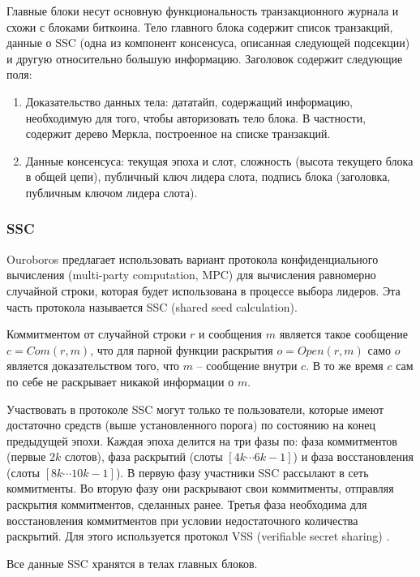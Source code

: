\documentclass[specification,annotation]{itmo-student-thesis}
\begin{document}
Главные блоки несут основную функциональность транзакционного журнала
и схожи с блоками биткоина. Тело главного блока содержит список
транзакций, данные о SSC (одна из компонент консенсуса, описанная
следующей подсекции) и другую относительно большую
информацию. Заголовок содержит следующие поля:

\begin{enumerate}
\item Доказательство данных тела: дататайп, содержащий информацию,
  необходимую для того, чтобы авторизовать тело блока. В частности,
  содержит дерево Меркла, построенное на списке транзакций.
\item Данные консенсуса: текущая эпоха и слот, сложность (высота
  текущего блока в общей цепи), публичный ключ лидера слота, подпись
  блока (заголовка, публичным ключом лидера слота).
\end{enumerate}

\subsubsection{SSC}

Ouroboros предлагает использовать вариант протокола конфиденциального
вычисления (multi-party computation, MPC) для вычисления равномерно
случайной строки, которая будет использована в процессе выбора
лидеров. Эта часть протокола называется SSC (shared seed calculation).

Коммитментом от случайной строки $r$ и сообщения $m$ является такое
сообщение $c = Com(r,m)$, что для парной функции раскрытия $o =
Open(r,m)$ само $o$ является доказательством того, что $m$ --
сообщение внутри $c$. В то же время $c$ сам по себе не раскрывает
никакой информации о $m$.

Участвовать в протоколе SSC могут только те пользователи, которые
имеют достаточно средств (выше установленного порога) по состоянию на
конец предыдущей эпохи. Каждая эпоха делится на три фазы по: фаза
коммитментов (первые $2k$ слотов), фаза раскрытий (слоты $[4k\cdots6k-1]$)
и фаза восстановления (слоты $[8k\cdots10k-1]$). В первую фазу участники
SSC рассылают в сеть коммитменты. Во вторую фазу они раскрывают свои
коммитменты, отправляя раскрытия коммитментов, сделанных ранее. Третья
фаза необходима для восстановления коммитментов при условии
недостаточного количества раскрытий. Для этого используется протокол
VSS (verifiable secret sharing) \cite{feldman1987practical}.

Все данные SSC хранятся в телах главных блоков.
\end{document}
